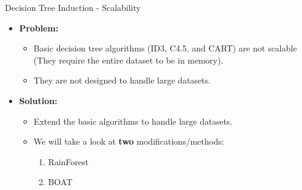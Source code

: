 \begin{frame}{Decision Tree Induction - Scalability}
	\begin{itemize}
		\item \textbf{Problem:}
		      \begin{itemize}
			      \item Basic decision tree algorithms (ID3, C4.5, and CART) are not scalable \\
			            (They require the entire dataset to be in memory).
			      \item They are not designed to handle large datasets.
		      \end{itemize}
		\item \textbf{Solution:}
		      \begin{itemize}
			      \item Extend the basic algorithms to handle large datasets.
			      \item We will take a look at \textbf{two} modifications/methods:
			            \begin{enumerate}
				            \item RainForest
				            \item BOAT
			            \end{enumerate}
		      \end{itemize}
	\end{itemize}
\end{frame}

